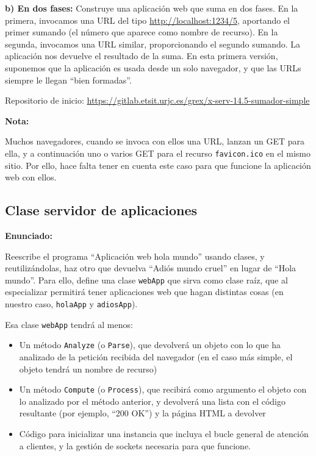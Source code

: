 {\bf b) En dos fases: } Construye una aplicación web que suma en dos fases. En la primera, invocamos una URL del tipo \url{http://localhost:1234/5}, aportando el primer sumando (el número que aparece como nombre de recurso). En la segunda, invocamos una URL similar, proporcionando el segundo sumando. La aplicación nos devuelve el resultado de la suma. En esta primera versión, suponemos que la aplicación es usada desde un solo navegador, y que las URLs siempre le llegan ``bien formadas''.

Repositorio de inicio: \url{https://gitlab.etsit.urjc.es/grex/x-serv-14.5-sumador-simple}

\textbf{Nota:}

Muchos navegadores, cuando se invoca con ellos una URL, lanzan un GET para ella, y a continuación uno o varios GET para el recurso \texttt{favicon.ico} en el mismo sitio. Por ello, hace falta tener en cuenta este caso para que funcione la aplicación web con ellos.

\subsection{Clase servidor de aplicaciones}
\label{subsec:clase-serv-aplis}

\textbf{Enunciado:}

Reescribe el programa ``Aplicación web hola mundo'' usando clases, y reutilizándolas, haz otro que devuelva ``Adiós mundo cruel'' en lugar de ``Hola mundo''. Para ello, define una clase \texttt{webApp} que sirva como clase raíz, que al especializar permitirá tener aplicaciones web que hagan distintas cosas (en nuestro caso, \texttt{holaApp} y \texttt{adiosApp}).

Esa clase \texttt{webApp} tendrá al menos:

\begin{itemize}
\item Un método \texttt{Analyze} (o \texttt{Parse}), que devolverá un objeto con lo que ha analizado de la petición recibida del navegador (en el caso más simple, el objeto tendrá un nombre de recurso)
\item Un método \texttt{Compute} (o \texttt{Process}), que recibirá como argumento el objeto con lo analizado por el método anterior, y devolverá una lista con el código resultante (por ejemplo, ``200 OK'') y la página HTML a devolver
\item Código para inicializar una instancia que incluya el bucle general de atención a clientes, y la gestión de sockets necesaria para que funcione.
\end{itemize}

